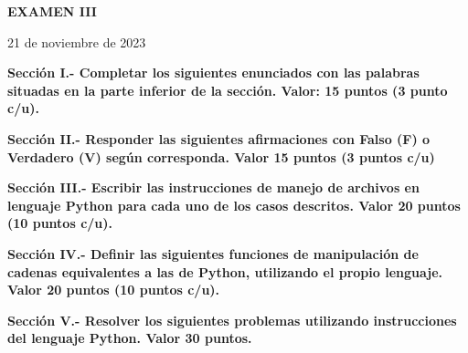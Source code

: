 \documentclass[10pt,addpoints]{exam}
\begin{document}
\begin{center}
  \sffamily\textbf{EXAMEN III}
\end{center}
\begin{flushright}
21 de noviembre de 2023
\end{flushright}

\begin{questions}
\begin{EnvFullwidth}
  \sffamily\textbf{Sección I.- Completar los siguientes enunciados con las
  palabras situadas en la parte inferior de la sección. Valor: 15 puntos
  (3 punto c/u).}
\end{EnvFullwidth}








\end{questions}

\begin{questions}
\begin{EnvFullwidth}
  \sffamily\textbf{Sección II.- Responder las siguientes afirmaciones con
  Falso (F) o Verdadero (V) según corres\-ponda. Valor 15 puntos (3 puntos c/u)}
\end{EnvFullwidth}







\end{questions}


\begin{questions}
\begin{EnvFullwidth}
  \sffamily\textbf{Sección III.- Escribir las instrucciones de manejo de
  archivos en lenguaje Python para cada uno de los casos descritos. Valor 20
  puntos (10 puntos c/u).
  }
\end{EnvFullwidth}



%

\end{questions}

\begin{questions}
\begin{EnvFullwidth}
  \sffamily\textbf{Sección IV.- Definir las siguientes funciones de
  manipulación de cadenas equivalentes a las de Python, utilizando el propio
  lenguaje. Valor 20 puntos (10 puntos c/u).
  }
\end{EnvFullwidth}



%

\end{questions}

\begin{questions}
\begin{EnvFullwidth}
  \sffamily\textbf{Sección V.- Resolver los siguientes problemas utilizando
  instrucciones del lenguaje Python. Valor 30 puntos.
  }
\end{EnvFullwidth}


%
%

\end{questions}
\end{document}
